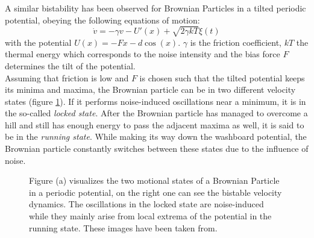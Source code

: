 \documentclass[12pt,a4paper]{article}
\begin{document}
A similar bistability has been observed for Brownian Particles in a tilted periodic potential, obeying the following equations of motion\cite{bpp}: 
\begin{equation}
\dot{v}=-\gamma v-U'(x)+\sqrt{2\gamma kT}\xi(t)
\end{equation}
with the potential $U(x)=-Fx-d\cos(x)$. $\gamma$ is the friction coefficient, $kT$ the thermal energy which corresponds to the noise intensity and the bias force $F$ determines the tilt of the potential.
\\
Assuming that friction is low and $F$ is chosen such that the tilted potential keeps its minima and maxima, the Brownian particle can be in two different velocity states (figure \ref{veldynintro}). If it performs noise-induced oscillations near a minimum, it is in the so-called \textit{locked state}. After the Brownian particle has managed to overcome a hill and still has enough energy to pass the adjacent maxima as well, it is said to be in the \textit{running state}. While making its way down the washboard potential, the Brownian particle constantly switches between these states due to the influence of noise.

\begin{figure}[H]
	\caption{Figure (a) visualizes the two motional states of a Brownian Particle in a periodic potential, on the right one can see the bistable velocity dynamics. The oscillations in the locked state are noise-induced while they mainly arise from local extrema of the potential in the running state. These images have been taken from\cite{bpp}.}
	\label{veldynintro} 
\end{figure}
\end{document}
